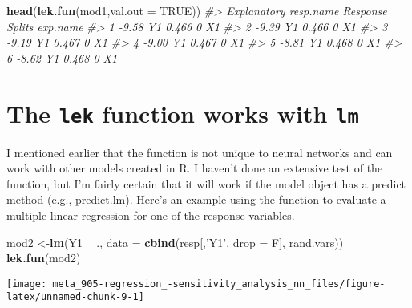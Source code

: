\documentclass[]{book}
\newenvironment{Shaded}{\begin{snugshade}}{\end{snugshade}}
\newcommand{\CommentTok}[1]{\textcolor[rgb]{0.56,0.35,0.01}{\textit{#1}}}
\newcommand{\DataTypeTok}[1]{\textcolor[rgb]{0.13,0.29,0.53}{#1}}
\newcommand{\KeywordTok}[1]{\textcolor[rgb]{0.13,0.29,0.53}{\textbf{#1}}}
\newcommand{\NormalTok}[1]{#1}
\newcommand{\OperatorTok}[1]{\textcolor[rgb]{0.81,0.36,0.00}{\textbf{#1}}}
\newcommand{\OtherTok}[1]{\textcolor[rgb]{0.56,0.35,0.01}{#1}}
\newcommand{\StringTok}[1]{\textcolor[rgb]{0.31,0.60,0.02}{#1}}
\begin{document}
\begin{Shaded}
\begin{Highlighting}[]
\KeywordTok{head}\NormalTok{(}\KeywordTok{lek.fun}\NormalTok{(mod1,}\DataTypeTok{val.out =} \OtherTok{TRUE}\NormalTok{))}
\CommentTok{#>   Explanatory resp.name Response Splits exp.name}
\CommentTok{#> 1       -9.58        Y1    0.466      0       X1}
\CommentTok{#> 2       -9.39        Y1    0.466      0       X1}
\CommentTok{#> 3       -9.19        Y1    0.467      0       X1}
\CommentTok{#> 4       -9.00        Y1    0.467      0       X1}
\CommentTok{#> 5       -8.81        Y1    0.468      0       X1}
\CommentTok{#> 6       -8.62        Y1    0.468      0       X1}
\end{Highlighting}
\end{Shaded}

\hypertarget{the-lek-function-works-with-lm}{%
\section{\texorpdfstring{The \texttt{lek} function works with \texttt{lm}}{The lek function works with lm}}\label{the-lek-function-works-with-lm}}

I mentioned earlier that the function is not unique to neural networks and can work with other models created in R. I haven't done an extensive test of the function, but I'm fairly certain that it will work if the model object has a predict method (e.g., predict.lm). Here's an example using the function to evaluate a multiple linear regression for one of the response variables.

\begin{Shaded}
\begin{Highlighting}[]
\NormalTok{mod2 <-}\KeywordTok{lm}\NormalTok{(Y1 }\OperatorTok{~}\StringTok{ }\NormalTok{., }\DataTypeTok{data =} \KeywordTok{cbind}\NormalTok{(resp[,}\StringTok{'Y1'}\NormalTok{, }\DataTypeTok{drop =}\NormalTok{ F], rand.vars))}
\KeywordTok{lek.fun}\NormalTok{(mod2)}
\end{Highlighting}
\end{Shaded}

\begin{center}\texttt{[image: meta\_905-regression\_-sensitivity\_analysis\_nn\_files/figure-latex/unnamed-chunk-9-1]} \end{center}
\end{document}

